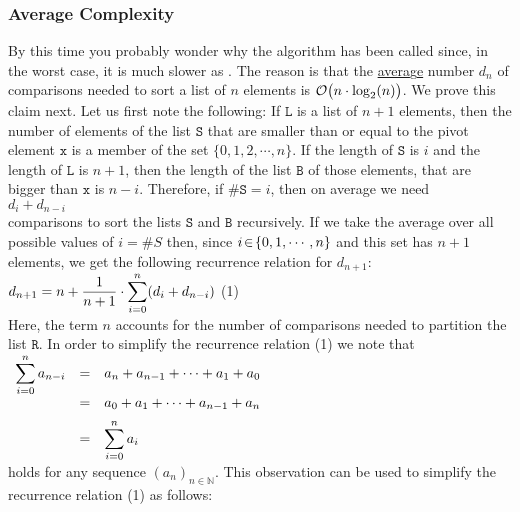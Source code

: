 \subsubsection{Average Complexity}
By this time you probably wonder why the algorithm has been called  since, in the worst case,
it is much slower as .  The reason is that the \underline{avera}g\underline{e} number $d_n$ of 
comparisons needed to sort a list of $n$ elements is $\mathcal{O}\bigl(n \cdot \log_2(n)\bigr)$. We prove
this claim next.  Let us first note the following: If $\mathtt{L}$ is a list of $n+1$ elements, then the number of elements of the 
list $\mathtt{S}$ that are smaller than or equal to the pivot element $\mathtt{x}$ is a member of the set 
$\{0,1,2,\cdots,n\}$.  If the length of $\mathtt{S}$ is $i$ and the length of $\mathtt{L}$ is $n+1$, then the length
of the list $\mathtt{B}$ of those elements, that are bigger than $\mathtt{x}$ is $n-i$.  Therefore, if $\#\mathtt{S} = i$, then on average we need
\\[0.2cm]
\hspace*{1.3cm} $d_i + d_{n-i}$ \\[0.2cm]
comparisons to sort the lists $\mathtt{S}$ and $\mathtt{B}$ recursively.  If we take the average over all possible values of
 $i = \#S$ then, since $i \!\in\!\{0,1,\cdots,n\}$ and this set has $n+1$ elements, we get the following
 recurrence relation for $d_{n+1}$: 
\\[0.2cm]
\hspace*{1.3cm}
$\displaystyle d_{n+1} = n + \frac{1}{n+1} \cdot \sum\limits_{i=0}^n (d_i + d_{n-i}) $ \hspace*{\fill} (1) 
\\[0.2cm] 
Here, the term $n$ accounts for the number of comparisons needed to partition the list $\mathtt{R}$.
In order to simplify the recurrence relation (1) we note that
\\[0.2cm]
\hspace*{1.3cm}
$
\begin{array}[t]{lcl}
 \displaystyle
 \sum\limits_{i=0}^n a_{n-i} & = & a_n + a_{n-1} + \cdots + a_1 + a_0 \\[0.2cm]
                    & = & a_0 + a_1 + \cdots + a_{n-1} + a_n \\[0.2cm]
                    & = & \displaystyle \sum\limits_{i=0}^n a_i 
\end{array}
$
\\[0.2cm]
holds for any sequence $(a_n)_{n\in\mathbb{N}}$.
This observation can be used to simplify the recurrence relation (1) as follows:
